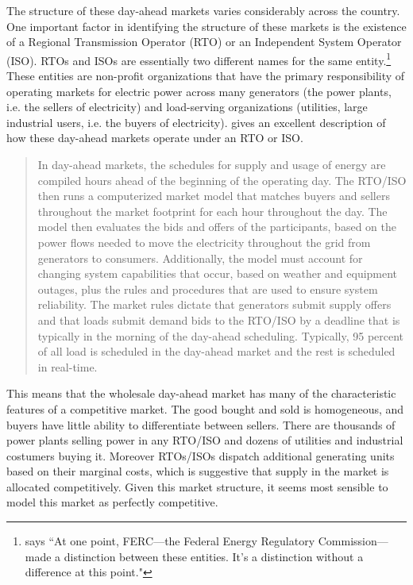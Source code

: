 The structure of these day-ahead markets varies considerably across the country. One important factor in identifying the structure of these markets is the existence of a Regional Transmission Operator (RTO) or an Independent System Operator (ISO). RTOs and ISOs are essentially two different names for the same entity.\footnote{\cite{rff_podcast1} says ``At one point, FERC---the Federal Energy Regulatory Commission---made a distinction between these entities. It's a distinction without a difference at this point."} These entities are non-profit organizations that have the primary responsibility of operating markets for electric power
across many generators (the power plants, i.e. the sellers of electricity) and load-serving organizations (utilities, large industrial users, i.e. the buyers of electricity). \cite{ferc2020} gives an excellent description of how these day-ahead markets operate under an RTO or ISO.
\begin{quote}
In day-ahead markets, the schedules for supply and usage of energy are compiled hours ahead of the beginning of the operating day. The RTO/ISO then runs a computerized market model that matches buyers and sellers throughout the market footprint for each hour throughout the day. The model then evaluates the bids and offers of the participants, based on the power flows needed to move the electricity throughout the grid from generators to consumers. Additionally, the model must account for changing system capabilities that occur, based on weather and equipment outages, plus the rules and procedures that are used to ensure system reliability. The market rules dictate that generators submit supply offers and that loads submit demand bids to the RTO/ISO by a deadline that is typically in the morning of the day-ahead scheduling. Typically, 95 percent of all load is scheduled in the day-ahead market and the rest is scheduled in real-time.
\end{quote}
This means that the wholesale day-ahead market has many of the characteristic features of a competitive market. The good bought and sold is homogeneous, and buyers have little ability to differentiate between  sellers. There are thousands of power plants selling power in any RTO/ISO and dozens of utilities and industrial costumers buying it. Moreover RTOs/ISOs dispatch additional generating units based on their marginal costs, which is suggestive that supply in the market is allocated competitively. Given this market structure, it seems most sensible to model this market as perfectly competitive. 

